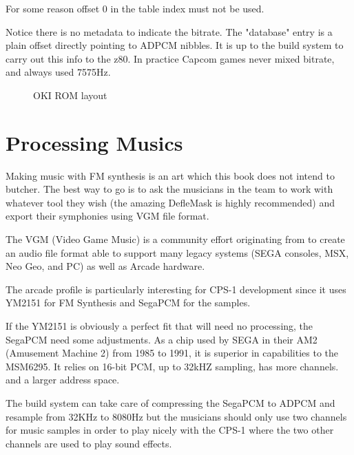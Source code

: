For some reason offset 0 in the table index must not be used.



Notice there is no metadata to indicate the bitrate. The "database" entry is a plain offset directly pointing to ADPCM nibbles. It is up to the build system to carry out this info to the z80. In practice Capcom games never mixed bitrate, and always used 7575Hz.

\begin{figure}[H]
\caption*{OKI ROM layout\cite{MSM6295_datasheet}}
\end{figure}















\section{Processing Musics}
Making music with FM synthesis is an art which this book does not intend to butcher. The best way to go is to ask the musicians in the team to work with whatever tool they wish (the amazing DefleMask is highly recommended) and export their symphonies using VGM file format.

The VGM (Video Game Music) is a community effort originating from  to create an audio file format able to support many legacy systems (SEGA consoles, MSX, Neo Geo, and PC) as well as Arcade hardware.

The arcade profile is particularly interesting for CPS-1 development since it uses YM2151 for FM Synthesis and SegaPCM for the samples.

If the YM2151 is obviously a perfect fit that will need no processing, the SegaPCM need some adjustments. As a chip used by SEGA in their AM2 (Amusement Machine 2) from 1985 to 1991, it is superior in capabilities to the MSM6295. It relies on 16-bit PCM, up to 32kHZ sampling, has more channels. and a larger address space.

The build system can take care of compressing the SegaPCM to ADPCM and resample from 32KHz to 8080Hz but the musicians should only use two channels for music samples in order to play nicely with the CPS-1 where the two other channels are used to play sound effects.


